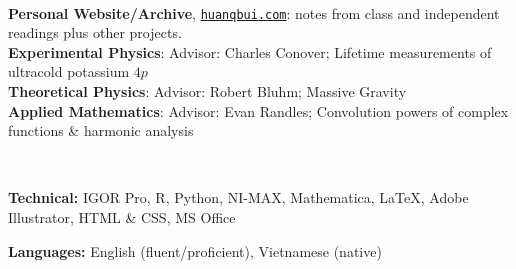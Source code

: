 \documentclass[letter, 10pt]{article}
\newcommand{\longunderline}[1]{\uline{#1\hfill\mbox{}}}
\begin{document}
	\noindent \longunderline{\normalsize{{}}}
	\\ \vspace{-7pt}
	
	\noindent \textbf{Personal Website/Archive}, \href{https://huanqbui.com}{\texttt{huanqbui.com}}: notes from class and independent readings plus other projects.\\ %
	\noindent \textbf{Experimental Physics}: Advisor: Charles Conover; Lifetime measurements of ultracold potassium $4p$\\
	\noindent \textbf{Theoretical Physics}: Advisor: Robert Bluhm; Massive Gravity\\
	\noindent \textbf{Applied Mathematics}: Advisor: Evan Randles; Convolution powers of complex functions \& harmonic analysis\\
	\vspace{-7pt} 
	
		\noindent \longunderline{\normalsize{{}}}
	\\ \vspace{-7pt}
	
	\noindent \textbf{Technical:} IGOR Pro, R, Python,  NI-MAX, Mathematica, \LaTeX{}, Adobe Illustrator, HTML \& CSS, MS Office
	
	\noindent \textbf{Languages:} English (fluent/proficient), Vietnamese (native)\\
	\vspace{-7pt}

	

	
%	

	
\end{document}
